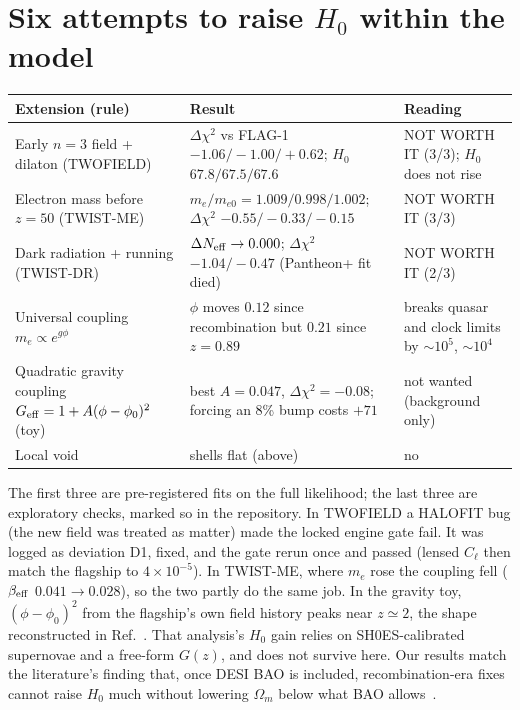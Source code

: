 \documentclass[11pt]{article}
\begin{document}
\section{Six attempts to raise $H_0$ within the model}
\begin{center}
\small
\begin{tabular}{p{4.1cm}p{5.6cm}p{4.6cm}}
\toprule
Extension (rule) & Result & Reading\\
\midrule
Early $n=3$ field + dilaton (TWOFIELD) & $\Delta\chi^2$ vs FLAG-1 $-1.06/-1.00/+0.62$; $H_0$ $67.8/67.5/67.6$ & NOT WORTH IT (3/3); $H_0$ does not rise\\
Electron mass before $z=50$ (TWIST-ME) & $m_e/m_{e0}=1.009/0.998/1.002$; $\Delta\chi^2$ $-0.55/-0.33/-0.15$ & NOT WORTH IT (3/3)\\
Dark radiation + running (TWIST-DR) & $\Delta N_{\rm eff}\to0.000$; $\Delta\chi^2$ $-1.04/-0.47$ (Pantheon+ fit died) & NOT WORTH IT (2/3)\\
Universal coupling $m_e\propto e^{g\phi}$ & $\phi$ moves $0.12$ since recombination but $0.21$ since $z=0.89$ & breaks quasar and clock limits by $\sim10^5$, $\sim10^4$\\
Quadratic gravity coupling $G_{\rm eff}=1+A(\phi-\phi_0)^2$ (toy) & best $A=0.047$, $\Delta\chi^2=-0.08$; forcing an 8\% bump costs $+71$ & not wanted (background only)\\
Local void & shells flat (above) & no\\
\bottomrule
\end{tabular}
\end{center}
The first three are pre-registered fits on the full likelihood; the last three are exploratory checks, marked so in the
repository. In TWOFIELD a HALOFIT bug (the new field was treated as matter) made the locked engine gate fail. It was
logged as deviation D1, fixed, and the gate rerun once and passed (lensed $C_\ell$ then match the flagship to
$4\times10^{-5}$). In TWIST-ME, where $m_e$ rose the coupling fell ($\beta_{\rm eff}$ $0.041\to0.028$), so the two
partly do the same job. In the gravity toy, $(\phi-\phi_0)^2$ from the flagship's own field history peaks near $z\simeq2$,
the shape reconstructed in Ref.~\cite{scalartensor2025}. That analysis's $H_0$ gain relies on SH0ES-calibrated
supernovae and a free-form $G(z)$, and does not survive here. Our results match the literature's finding that, once DESI
BAO is included, recombination-era fixes cannot raise $H_0$ much without lowering $\Omega_m$ below what BAO
allows~\cite{recomb2026}.
\end{document}
